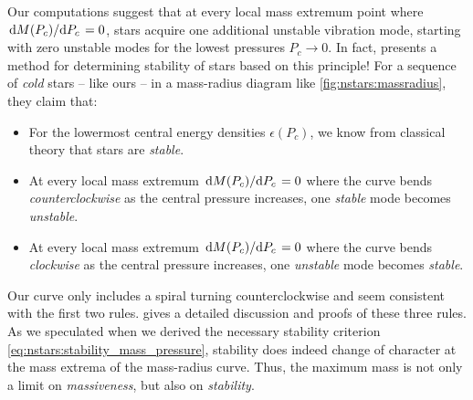 Our computations suggest that at every local mass extremum point where $\odv{M(P_c)}/{P_c} = 0$, stars acquire one additional unstable vibration mode, starting with zero unstable modes for the lowest pressures $P_c \rightarrow 0$.
In fact, \cite{ref:stability_methods} presents a method for determining stability of stars based on this principle!
For a sequence of \emph{cold} stars -- like ours -- in a mass-radius diagram like \cref{fig:nstars:massradius}, they claim that:
\begin{itemize}
\item For the lowermost central energy densities $\epsilon(P_c)$, we know from classical theory that stars are \emph{stable}.
\item At every local mass extremum $\odv{M(P_c)}/{P_c} = 0$ where the curve bends \emph{counterclockwise} as the central pressure increases, one \emph{stable} mode becomes \emph{unstable}.
\item At every local mass extremum $\odv{M(P_c)}/{P_c} = 0$ where the curve bends \emph{clockwise} as the central pressure increases, one \emph{unstable} mode becomes \emph{stable}.
\end{itemize}
Our curve only includes a spiral turning counterclockwise and seem consistent with the first two rules.
\cite{ref:stability_rules_thorne} gives a detailed discussion and proofs of these three rules.
As we speculated when we derived the necessary stability criterion \eqref{eq:nstars:stability_mass_pressure}, stability does indeed change of character at the mass extrema of the mass-radius curve.
Thus, the maximum mass is not only a limit on \emph{massiveness}, but also on \emph{stability}.


